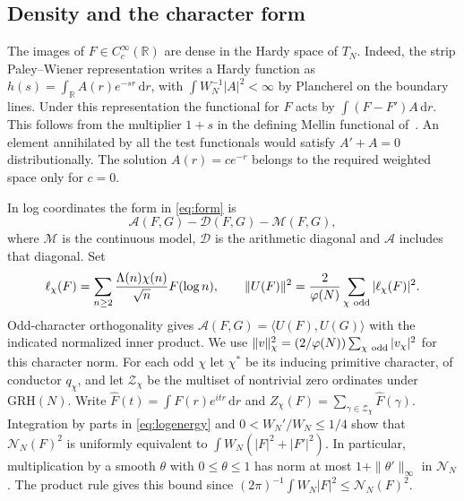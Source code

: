 \documentclass[11pt,a4paper]{article}
\numberwithin{equation}{section}
\newcommand{\grh}{\mathrm{GRH}}
\newcommand{\ud}{\mathrm d}
\newcommand{\NN}{\mathcal N_N}
\begin{document}
\subsection{Density and the character form}

The images of $F\in C_c^\infty(\mathbb R)$ are dense in the Hardy
space of $T_N$. Indeed, the strip Paley--Wiener representation
\cite[Theorem~2.1]{MaiQian} writes a Hardy function as
$h(s)=\int_{\mathbb R} A(r)e^{-sr}\,\ud r$, with
$\int W_N^{-1}|A|^2<\infty$ by Plancherel on the boundary lines.
Under this representation the functional for $F$ acts by
$\int (F-F')A\,\ud r$. This follows from the multiplier $1+s$
in the defining Mellin functional of~\cite[Proposition~7.4]{LiLiu}.
An element annihilated by all the test functionals would satisfy
$A'+A=0$ distributionally. The solution $A(r)=c e^{-r}$ belongs
to the required weighted space only for $c=0$.

In log coordinates the form in \cref{eq:form} is
\begin{equation}
  \mathcal A(F,G)-\mathcal D(F,G)-\mathcal M(F,G),
  \label{eq:split}
\end{equation}
where $\mathcal M$ is the continuous model, $\mathcal D$ is the
arithmetic diagonal and $\mathcal A$ includes that diagonal.
Set
\[
  \ell_\chi(F)
    =\sum_{n\ge2}\frac{\Lambda(n)\chi(n)}{\sqrt n}F(\log n),
  \qquad
  \|U(F)\|^2=\frac{2}{\varphi(N)}\sum_{\chi\ {\rm odd}}|\ell_\chi(F)|^2.
\]
Odd-character orthogonality gives
$\mathcal A(F,G)=\langle U(F),U(G)\rangle$ with the indicated normalized
inner product. We use $\|v\|_\chi^2=(2/\varphi(N))\sum_{\chi\ {\rm odd}}
|v_\chi|^2$ for this character norm.
For each odd $\chi$ let $\chi^*$ be its inducing primitive character,
of conductor $q_\chi$, and let $\mathcal Z_\chi$ be the multiset of
nontrivial zero ordinates under $\grh(N)$. Write
$\widehat F(t)=\int F(r)e^{itr}\,\ud r$ and
$Z_\chi(F)=\sum_{\gamma\in\mathcal Z_\chi}\widehat F(\gamma)$.
Integration by parts in \cref{eq:logenergy} and
$0<W_N'/W_N\le1/4$ show that $\NN(F)^2$ is uniformly equivalent to
$\int W_N(|F|^2+|F'|^2)$. In particular, multiplication by a
smooth $\theta$ with $0\le\theta\le1$ has norm at most
$1+\|\theta'\|_\infty$ in $\NN$. The product rule gives this bound
since $(2\pi)^{-1}\int W_N|F|^2\le\NN(F)^2$.
\end{document}
